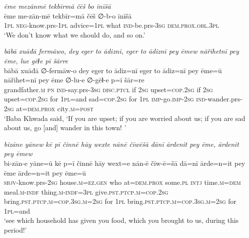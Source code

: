 \ea \label{BP.157}
\textit{ēme mezānmē tekbīrmā čēš bo īnīšā} \\ 
\gll ēme me-zān-mē tekbīr=mā čēš ∅-b-o īnīšā \\ 
 \textsc{1pl} \textsc{neg-}know.prs\textsc{-\textsc{1pl}} advice\textsc{=\textsc{1pl}} what \textsc{ind-}be.prs\textsc{-3sg} \textsc{dem.prox}\textsc{.obl}\textsc{.3pl} \\ 
\glt `We don’t know what we should do, and so on.'
\z 
 
\ea \label{BP.160}
\textit{bābā xuāđā fermāwo, dey eger to ādiznī, eger to ādiznī pey ēmew nāřihetnī pey ēme, lue gēɫe pī šārre} \\ 
\gll bābā xuāđā ∅-fermāw-o dey eger to ādiz=nī eger to ādiz=nī pey ēme=ū nāřihet=nī pey ēme ∅-lu-e ∅-gēɫ-e p=ī šār=re \\ 
 grandfather\textsc{.m} \textsc{pn} \textsc{ind-}say.prs\textsc{-3sg} \textsc{disc.ptcl} if \textsc{2sg} upset\textsc{=cop}\textsc{.\textsc{2sg}} if \textsc{2sg} upset\textsc{=cop}\textsc{.\textsc{2sg}} for \textsc{1pl}=and sad\textsc{=cop}\textsc{.\textsc{2sg}} for \textsc{1pl} \textsc{imp-}go.\textsc{imp-}\textsc{2sg} \textsc{ind-}wander.prs-\textsc{2sg} at=\textsc{dem.prox} city\textsc{.m}\textsc{=\textsc{post}} \\ 
\glt `Baba Khwada said, ‘If you are upset; if you are worried about us; if you are sad about us, go [and] wander in this town! '
\z 
 
\ea \label{BP.161}
\textit{bizāne yānew kē pī činnē hāy wexte nānē čīwēšā dānī ārdenit pey ēme, ārdenit pey ēmew} \\ 
\gll bi-zān-e yāne=ū kē p=ī činnē hāy wext=e nān-ē čīw-ē=šā dā=nī ārde=n=it pey ēme ārde=n=it pey ēme=ū \\ 
 \textsc{sbjv-}know.prs-\textsc{2sg} house\textsc{.m}\textsc{=ez.gen} who at=\textsc{dem.prox} some\textsc{.pl} \textsc{intj} time\textsc{.m}\textsc{=dem} meal\textsc{.m}\textsc{-indf} thing\textsc{.m}\textsc{-indf}\textsc{=3pl} give\textsc{.pst}\textsc{.ptcp}\textsc{.m}\textsc{=cop}\textsc{.\textsc{2sg}} bring\textsc{.pst}\textsc{.ptcp}\textsc{.m}\textsc{=cop}\textsc{.3sg}\textsc{.m}\textsc{=\textsc{2sg}} for \textsc{1pl} bring\textsc{.pst}\textsc{.ptcp}\textsc{.m}\textsc{=cop}\textsc{.3sg}\textsc{.m}\textsc{=\textsc{2sg}} for \textsc{1pl}=and \\ 
\glt `see which household has given you food, which you brought to us, during this period!'
\z 
 
